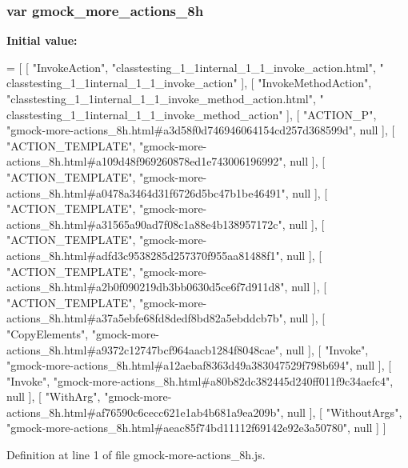 \subsubsection[{\texorpdfstring{gmock\+\_\+more\+\_\+actions\+\_\+8h}{gmock_more_actions_8h}}]{\setlength{\rightskip}{0pt plus 5cm}var gmock\+\_\+more\+\_\+actions\+\_\+8h}\hypertarget{gmock-more-actions__8h_8js_a3489e2000f725c4a727d77bc20afee94}{}\label{gmock-more-actions__8h_8js_a3489e2000f725c4a727d77bc20afee94}
{\bfseries Initial value\+:}
\begin{DoxyCode}
=
[
    [ \textcolor{stringliteral}{"InvokeAction"}, \textcolor{stringliteral}{"classtesting\_1\_1internal\_1\_1\_invoke\_action.html"}, \textcolor{stringliteral}{"
      classtesting\_1\_1internal\_1\_1\_invoke\_action"} ],
    [ \textcolor{stringliteral}{"InvokeMethodAction"}, \textcolor{stringliteral}{"classtesting\_1\_1internal\_1\_1\_invoke\_method\_action.html"}, \textcolor{stringliteral}{"
      classtesting\_1\_1internal\_1\_1\_invoke\_method\_action"} ],
    [ \textcolor{stringliteral}{"ACTION\_P"}, \textcolor{stringliteral}{"gmock-more-actions\_8h.html#a3d58f0d746946064154cd257d368599d"}, null ],
    [ \textcolor{stringliteral}{"ACTION\_TEMPLATE"}, \textcolor{stringliteral}{"gmock-more-actions\_8h.html#a109d48f969260878ed1e743006196992"}, null ],
    [ \textcolor{stringliteral}{"ACTION\_TEMPLATE"}, \textcolor{stringliteral}{"gmock-more-actions\_8h.html#a0478a3464d31f6726d5bc47b1be46491"}, null ],
    [ \textcolor{stringliteral}{"ACTION\_TEMPLATE"}, \textcolor{stringliteral}{"gmock-more-actions\_8h.html#a31565a90ad7f08c1a88e4b138957172c"}, null ],
    [ \textcolor{stringliteral}{"ACTION\_TEMPLATE"}, \textcolor{stringliteral}{"gmock-more-actions\_8h.html#adfd3c9538285d257370f955aa81488f1"}, null ],
    [ \textcolor{stringliteral}{"ACTION\_TEMPLATE"}, \textcolor{stringliteral}{"gmock-more-actions\_8h.html#a2b0f090219db3bb0630d5ce6f7d911d8"}, null ],
    [ \textcolor{stringliteral}{"ACTION\_TEMPLATE"}, \textcolor{stringliteral}{"gmock-more-actions\_8h.html#a37a5ebfe68fd8dedf8bd82a5ebddcb7b"}, null ],
    [ \textcolor{stringliteral}{"CopyElements"}, \textcolor{stringliteral}{"gmock-more-actions\_8h.html#a9372c12747bcf964aacb1284f8048cae"}, null ],
    [ \textcolor{stringliteral}{"Invoke"}, \textcolor{stringliteral}{"gmock-more-actions\_8h.html#a12aebaf8363d49a383047529f798b694"}, null ],
    [ \textcolor{stringliteral}{"Invoke"}, \textcolor{stringliteral}{"gmock-more-actions\_8h.html#a80b82dc382445d240ff011f9c34aefc4"}, null ],
    [ \textcolor{stringliteral}{"WithArg"}, \textcolor{stringliteral}{"gmock-more-actions\_8h.html#af76590c6cecc621e1ab4b681a9ea209b"}, null ],
    [ \textcolor{stringliteral}{"WithoutArgs"}, \textcolor{stringliteral}{"gmock-more-actions\_8h.html#aeac85f74bd11112f69142e92e3a50780"}, null ]
]
\end{DoxyCode}


Definition at line 1 of file gmock-\/more-\/actions\+\_\+8h.\+js.

